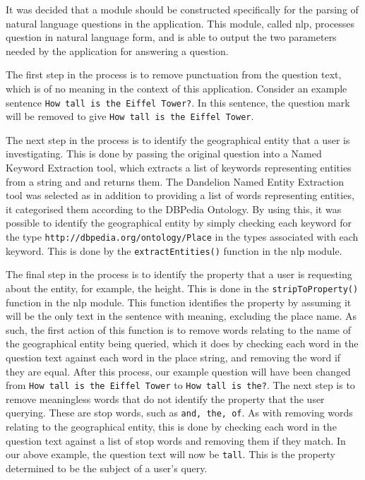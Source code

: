 \documentclass[authoryearcitations]{UoYCSproject}
\begin{document}
It was decided that a module should be constructed specifically for the parsing of natural language questions in the application.  This module, called nlp, processes question in natural language form, and is able to output the two parameters needed by the application for answering a question.

The first step in the process is to remove punctuation from the question text, which is of no meaning in the context of this application. Consider an example sentence \texttt{How tall is the Eiffel Tower?}. In this sentence, the question mark will be removed to give \texttt{How tall is the Eiffel Tower}.

\begin{sloppypar} %
The next step in the process is to identify the geographical entity that a user is investigating. This is done by passing the original question into a Named Keyword Extraction tool, which extracts a list of keywords representing entities from a string and and returns them. The Dandelion Named Entity Extraction tool was selected as in addition to providing a list of words representing entities, it categorised them according to the DBPedia Ontology. By using this, it was possible to identify the geographical entity by simply checking each keyword for the type \texttt{http://dbpedia.org/ontology/Place} in the types associated with each keyword.  This is done by the \texttt{extractEntities()} function in the nlp module.
\end{sloppypar}

The final step in the process is to identify the property that a user is requesting about the entity, for example, the height. This is done in the \texttt{stripToProperty()} function in the nlp module. This function identifies the property by assuming it will be the only text in the sentence with meaning, excluding the place name. As such, the first action of this function is to remove words relating to the name of the geographical entity being queried, which it does by checking each word in the question text against each word in the place string, and removing the word if they are equal. After this process, our example question will have been changed from \texttt{How tall is the Eiffel Tower} to \texttt{How tall is the?}. The next step is to remove meaningless words that do not identify the property that the user querying. These are stop words, such as \texttt{and, the, of}. As with removing words relating to the geographical entity, this is done by checking each word in the question text against a list of stop words and removing them if they match. In our above example, the question text will now be \texttt{tall}. This is the property determined to be the subject of a user's query.
\end{document}
